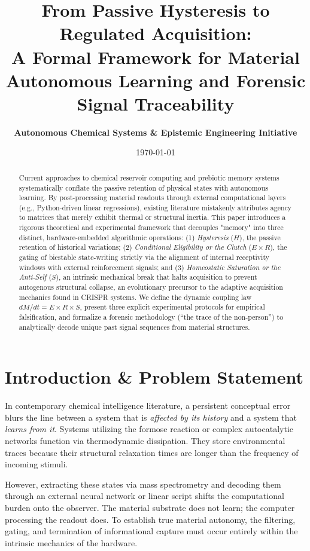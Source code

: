 \documentclass[11pt,a4paper]{article}
\title{\textbf{From Passive Hysteresis to Regulated Acquisition:\\A Formal Framework for Material Autonomous Learning and Forensic Signal Traceability}}
\author{\textbf{Autonomous Chemical Systems & Epistemic Engineering Initiative}}
\date{\today}
\begin{document}
\maketitle

\begin{abstract}
Current approaches to chemical reservoir computing and prebiotic memory systems systematically conflate the passive retention of physical states with autonomous learning. By post-processing material readouts through external computational layers (e.g., Python-driven linear regressions), existing literature mistakenly attributes agency to matrices that merely exhibit thermal or structural inertia. This paper introduces a rigorous theoretical and experimental framework that decouples "memory" into three distinct, hardware-embedded algorithmic operations: (1) \textit{Hysteresis} ($H$), the passive retention of historical variations; (2) \textit{Conditional Eligibility or the Clutch} ($E \times R$), the gating of biestable state-writing strictly via the alignment of internal receptivity windows with external reinforcement signals; and (3) \textit{Homeostatic Saturation or the Anti-Self} ($S$), an intrinsic mechanical break that halts acquisition to prevent autogenous structural collapse, an evolutionary precursor to the adaptive acquisition mechanics found in CRISPR systems. We define the dynamic coupling law $dM/dt = E \times R \times S$, present three explicit experimental protocols for empirical falsification, and formalize a forensic methodology (``the trace of the non-person'') to analytically decode unique past signal sequences from material structures.
\end{abstract}

\section{Introduction \& Problem Statement}
In contemporary chemical intelligence literature, a persistent conceptual error blurs the line between a system that is \textit{affected by its history} and a system that \textit{learns from it}. Systems utilizing the formose reaction or complex autocatalytic networks function via thermodynamic dissipation. They store environmental traces because their structural relaxation times are longer than the frequency of incoming stimuli. 

However, extracting these states via mass spectrometry and decoding them through an external neural network or linear script shifts the computational burden onto the observer. The material substrate does not learn; the computer processing the readout does. To establish true material autonomy, the filtering, gating, and termination of informational capture must occur entirely within the intrinsic mechanics of the hardware.
\end{document}
